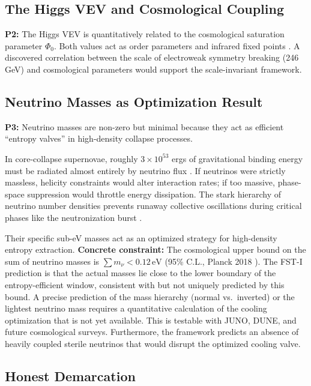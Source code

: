 \documentclass[12pt,a4paper]{article}
\theoremstyle{remark}
\begin{document}
\subsection{The Higgs VEV and Cosmological Coupling}

\textbf{P2:} The Higgs VEV is quantitatively related to the cosmological saturation parameter $\Phi_0$. Both values act as order parameters and infrared fixed points \citep{HiggsVEV2024}. A discovered correlation between the scale of electroweak symmetry breaking (246 GeV) and cosmological parameters would support the scale-invariant framework.

\subsection{Neutrino Masses as Optimization Result}

\textbf{P3:} Neutrino masses are non-zero but minimal because they act as efficient ``entropy valves'' in high-density collapse processes.

In core-collapse supernovae, roughly $3 \times 10^{53}$ ergs of gravitational binding energy must be radiated almost entirely by neutrino flux \citep{SupernovaNeutrinos,SupernovaSimulations}. If neutrinos were strictly massless, helicity constraints would alter interaction rates; if too massive, phase-space suppression would throttle energy dissipation. The stark hierarchy of neutrino number densities prevents runaway collective oscillations during critical phases like the neutronization burst \citep{NeutrinoOscillations}.

Their specific sub-eV masses act as an optimized strategy for high-density entropy extraction. \textbf{Concrete constraint:} The cosmological upper bound on the sum of neutrino masses is $\sum m_\nu < 0.12\,\text{eV}$ (95\% C.L., Planck 2018 \citep{Planck2018}). The FST-I prediction is that the actual masses lie close to the lower boundary of the entropy-efficient window, consistent with but not uniquely predicted by this bound. A precise prediction of the mass hierarchy (normal vs.\ inverted) or the lightest neutrino mass requires a quantitative calculation of the cooling optimization that is not yet available. This is testable with JUNO, DUNE, and future cosmological surveys. Furthermore, the framework predicts an absence of heavily coupled sterile neutrinos that would disrupt the optimized cooling valve.

\subsection{Honest Demarcation}
\end{document}

